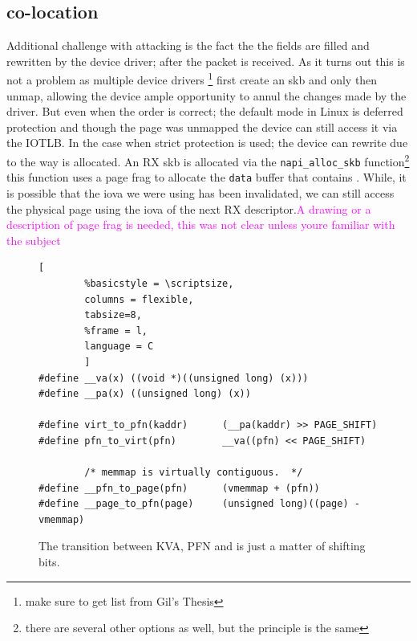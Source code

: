 \subsection{\shinfo co-location}
Additional challenge with attacking \shinfo is the fact the the fields are filled and rewritten by the device driver; after the packet is received. As it turns out this is not a problem as multiple device drivers \footnote{make sure to get list from Gil's Thesis} first create an skb and only then unmap, allowing the device ample opportunity to annul the changes made by the driver. But even when the order is correct; the default mode in Linux is deferred protection and though the page was unmapped the device can still access it via the IOTLB. In the case when strict protection is used; the device can rewrite \shinfo due to the way \shinfo is allocated. An RX skb is allocated via the \texttt{napi\_alloc\_skb} function\footnote{there are several other options as well, but the principle is the same} this function uses a page frag to allocate the \texttt{data} buffer that contains \shinfo. While, it is possible that the iova we were using has been invalidated, we can still access the physical page using the iova of the next RX descriptor.\textcolor{magenta}{A drawing or a description of page frag is needed, this was not clear unless youre familiar with the subject}
\begin{figure}[t]
                \begin{lstlisting}[
        %basicstyle = \scriptsize,
        columns = flexible,
        tabsize=8,
        %frame = l,
        language = C
        ]
#define __va(x) ((void *)((unsigned long) (x)))
#define __pa(x) ((unsigned long) (x))

#define virt_to_pfn(kaddr)      (__pa(kaddr) >> PAGE_SHIFT)
#define pfn_to_virt(pfn)        __va((pfn) << PAGE_SHIFT)

        /* memmap is virtually contiguous.  */
#define __pfn_to_page(pfn)      (vmemmap + (pfn))  
#define __page_to_pfn(page)     (unsigned long)((page) - vmemmap)
                \end{lstlisting}
        \caption{ The transition between KVA, PFN and \page is just a matter of shifting bits.
                }
        \label{fig:mem_model}
\end{figure}
